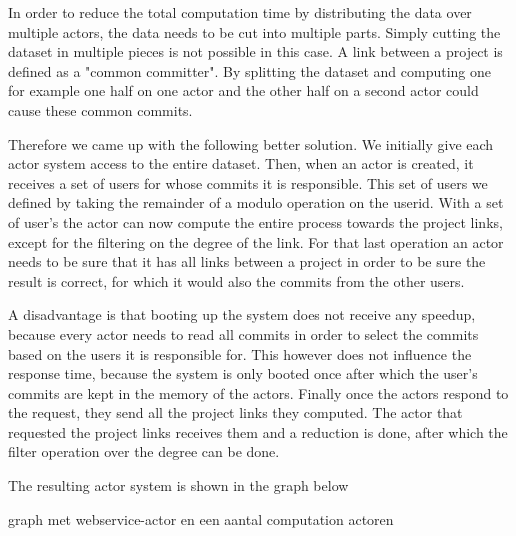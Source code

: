 \documentclass[10pt,a4paper]{article}
\begin{document}
In order to reduce the total computation time by distributing the data over multiple actors, the data needs to be cut into multiple parts. Simply cutting the dataset in multiple pieces is not possible in this case. A link between a project is defined as a "common committer". By splitting the dataset and computing one for example one half on one actor and the other half on a second actor could cause these common commits. 

Therefore we came up with the following better solution. We initially give each actor system access to the entire dataset. Then, when an actor is created, it receives a set of users for whose commits it is responsible. This set of users we defined by taking the remainder of a modulo operation on the userid. With a set of user's the actor can now compute the entire process towards the project links, except for the filtering on the degree of the link. For that last operation an actor needs to be sure that it has all links between a project in order to be sure the result is correct, for which it would also the commits from the other users.

A disadvantage is that booting up the system does not receive any speedup, because every actor needs to read all commits in order to select the commits based on the users it is responsible for. This however does not influence the response time, because the system is only booted once after which the user's commits are kept in the memory of the actors. Finally once the actors respond to the request, they send all the project links they computed. The actor that requested the project links receives them and a reduction is done, after which the filter operation over the degree can be done.

The resulting actor system is shown in the graph below

graph met webservice-actor en een aantal computation actoren
\end{document}
